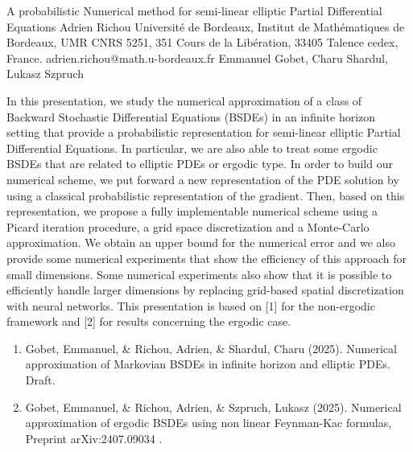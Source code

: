 \begin{talk}
  {A probabilistic Numerical method for semi-linear elliptic Partial Differential Equations}%
  {Adrien Richou}%
  {Universit\'e de Bordeaux, Institut de Math\'ematiques de Bordeaux, UMR CNRS 5251,
  351 Cours de la Lib\'eration, 33405 Talence cedex, France.}%
  {adrien.richou@math.u-bordeaux.fr}%
  {Emmanuel Gobet, Charu Shardul, Lukasz Szpruch}%
  
    
   
In this presentation, we study the numerical approximation of a class of Backward Stochastic Differential Equations (BSDEs) in an infinite horizon setting that provide a probabilistic representation for semi-linear elliptic Partial Differential Equations. In particular, we are also able to treat some ergodic BSDEs that are related to elliptic PDEs or ergodic type. In order to build our numerical scheme, we put forward a new representation of the PDE solution by using a classical probabilistic representation of the gradient. Then, based on this representation, we propose a fully implementable numerical scheme using a Picard iteration procedure, a grid space discretization and a Monte-Carlo approximation. We obtain an upper bound for the numerical error and we also provide some numerical experiments that show the
efficiency of this approach for small dimensions. Some numerical experiments also show that it is possible to efficiently handle larger dimensions by replacing grid-based spatial discretization with neural networks. This presentation is based on [1] for the non-ergodic framework and [2] for results concerning the ergodic case.

\medskip

\begin{enumerate}
 \item[{[1]}] Gobet, Emmanuel, \& Richou, Adrien, \& Shardul, Charu (2025). Numerical approximation of Markovian BSDEs in infinite
  horizon and elliptic PDEs. Draft.
 \item[{[2]}] Gobet, Emmanuel, \& Richou, Adrien, \& Szpruch, Lukasz (2025).  Numerical approximation of ergodic BSDEs using non
  linear Feynman-Kac formulas, Preprint arXiv:2407.09034 .
\end{enumerate}

\end{talk}


